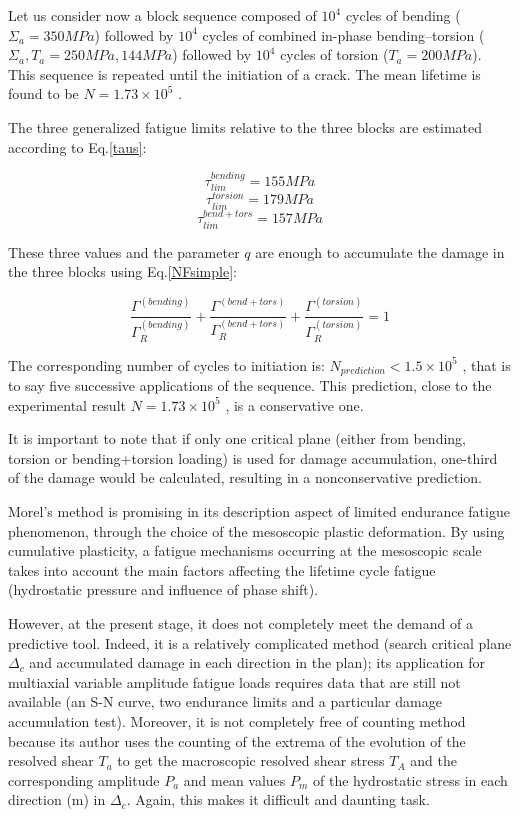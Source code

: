 Let us consider now a block sequence composed of
$10^4$ cycles of bending ($\Sigma_a =350 MPa$) followed by $10^4$
cycles of combined in-phase bending–torsion ($\Sigma_a ,T_a =250 MPa, 144 MPa$)
followed by $10^4$ cycles of torsion ($T_a =200 MPa$). This
sequence is repeated until the initiation of a crack. The
mean lifetime is found to be $N=1.73\times10^5$ .

The three generalized fatigue
limits relative to the three blocks are estimated according
to Eq.\eqref{taus}:

$$\tau_{lim}^{bending}=155 MPa$$   $$\tau_{lim}^{torsion}=179 MPa$$  $$\tau_{lim}^{bend+tors}=157 MPa$$


These three values and the parameter $q$ are enough to
accumulate the damage in the three blocks using Eq.\eqref{NFsimple}:


$$\frac{\Gamma^{(bending)}}{\Gamma_R^{(bending)}}+\frac{\Gamma^{(bend+tors)}}{\Gamma_R^{(bend+tors)}}+\frac{\Gamma^{(torsion)}}{\Gamma_R^{(torsion)}}=1$$

The corresponding number of cycles to initiation is:
$N_{prediction} <1.5\times10^5$ , that is to say five successive applications of the sequence. This prediction, close to the experimental result $N=1.73\times10^5$ , is a conservative one.

It is important to note that if only one critical plane
(either from bending, torsion or bending+torsion
loading) is used for damage accumulation, one-third of
the damage would be calculated, resulting in a nonconservative prediction.

Morel's method is promising in its description aspect of limited endurance fatigue phenomenon, through the choice of the  mesoscopic plastic deformation. By using cumulative plasticity, a fatigue mechanisms occurring at the mesoscopic scale takes into account the main factors affecting the lifetime cycle fatigue (hydrostatic pressure and influence of phase shift). 

However, at the present stage, it does not completely meet the demand of a predictive tool. Indeed, it is a relatively complicated method (search critical plane $\Delta_c$ and accumulated damage in each direction in the plan); its application for multiaxial variable amplitude fatigue loads requires data that are still not available (an S-N curve, two endurance limits and a particular  damage accumulation test). Moreover, it is not completely free of counting method because its author uses the counting of the extrema of the evolution of the resolved shear $T_a$ to get the macroscopic resolved shear stress $T_A$ and the corresponding amplitude $P_a$ and mean values $P_m$ of the hydrostatic stress in each direction (m) in $\Delta_c$. Again, this makes it difficult and daunting task.
